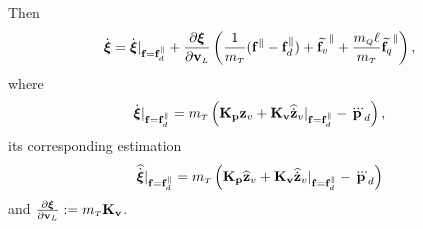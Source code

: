 \documentclass[journal,onecolumn]{IEEEtran}
\begin{document}
Then
%
\begin{align}
	\dot{\Xiq} = \dot{\Xiq}|_{\f=\fd^{\|}} + \frac{\partial \Xiq}{\partial \vL}\LP\frac{1}{\mT}(\f^{\|}-\fd^{\|}) + \widetilde{\f_v}^{\|} + \frac{\mQ\ellp}{\mT}\widetilde{\f_q}^{\|}\RP,
\end{align}
%
where
%
\begin{align}
	\dot{\Xiq}|_{\f=\fd^{\|}} = \mT\LP {\bf K_p}\zv + {\bf K_v} \zvdothat|_{\f=\fd^{\|}}
	- \pLdtdot\RP,
\end{align}
%
its corresponding estimation
%
\begin{align}
	\widehat{\dot{\Xiq}}|_{\f=\fd^{\|}} = \mT\LP {\bf K_p}\zvhat + {\bf K_v} \zvdothat|_{\f=\fd^{\|}}
	- \pLdtdot\RP
\end{align}
%
and $\frac{\partial \Xiq}{\partial \vL}:=\mT{\bf K_v}$.
\end{document}
